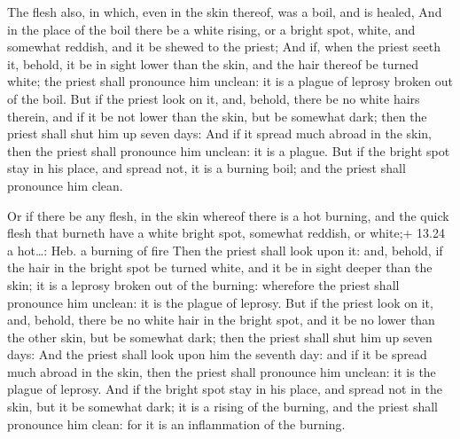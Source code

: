  The flesh also, in which, even in the skin thereof, was
a boil, and is healed,  And in the place of the boil there
be a white rising, or a bright spot, white, and somewhat reddish, and it
be shewed to the priest;  And if, when the priest seeth it,
behold, it be in sight lower than the skin, and the hair thereof be
turned white; the priest shall pronounce him unclean: it is a plague of
leprosy broken out of the boil.  But if the priest look on
it, and, behold, there be no white hairs therein, and if it be not lower
than the skin, but be somewhat dark; then the priest shall shut him up
seven days:  And if it spread much abroad in the skin, then
the priest shall pronounce him unclean: it is a plague. 
But if the bright spot stay in his place, and spread not, it is a
burning boil; and the priest shall pronounce him clean.

 Or if there be any flesh, in the skin whereof there is a
hot burning, and the quick flesh that burneth have a white bright spot,
somewhat reddish, or white;+ 13.24 a hot\ldots: Heb. a burning of fire
 Then the priest shall look upon it: and, behold, if the
hair in the bright spot be turned white, and it be in sight deeper than
the skin; it is a leprosy broken out of the burning: wherefore the
priest shall pronounce him unclean: it is the plague of leprosy.
 But if the priest look on it, and, behold, there be no
white hair in the bright spot, and it be no lower than the other skin,
but be somewhat dark; then the priest shall shut him up seven days:
 And the priest shall look upon him the seventh day: and if
it be spread much abroad in the skin, then the priest shall pronounce
him unclean: it is the plague of leprosy.  And if the
bright spot stay in his place, and spread not in the skin, but it be
somewhat dark; it is a rising of the burning, and the priest shall
pronounce him clean: for it is an inflammation of the burning.

